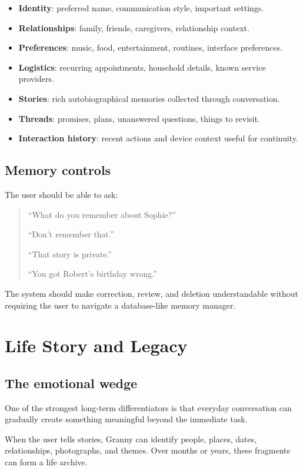 \documentclass[11pt]{article}
\begin{document}
\begin{itemize}[leftmargin=*]
    \item \textbf{Identity}: preferred name, communication style, important settings.
    \item \textbf{Relationships}: family, friends, caregivers, relationship context.
    \item \textbf{Preferences}: music, food, entertainment, routines, interface preferences.
    \item \textbf{Logistics}: recurring appointments, household details, known service providers.
    \item \textbf{Stories}: rich autobiographical memories collected through conversation.
    \item \textbf{Threads}: promises, plans, unanswered questions, things to revisit.
    \item \textbf{Interaction history}: recent actions and device context useful for continuity.
\end{itemize}

\subsection{Memory controls}
The user should be able to ask:

\begin{quote}
``What do you remember about Sophie?''

``Don't remember that.''

``That story is private.''

``You got Robert's birthday wrong.''
\end{quote}

The system should make correction, review, and deletion understandable without requiring the user to navigate a database-like memory manager.

\section{Life Story and Legacy}

\subsection{The emotional wedge}
One of the strongest long-term differentiators is that everyday conversation can gradually create something meaningful beyond the immediate task.

When the user tells stories, Granny can identify people, places, dates, relationships, photographs, and themes. Over months or years, these fragments can form a life archive.
\end{document}
